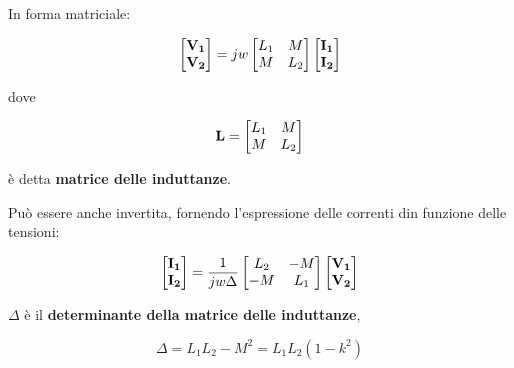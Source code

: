 In forma matriciale:

\begin{equation}
  \begin{bmatrix}
    \mathbf{V_1} \\
    \mathbf{V_2}
  \end{bmatrix}
  = jw
  \begin{bmatrix}
    L_1 & M   \\
    M   & L_2
  \end{bmatrix}
  \begin{bmatrix}
    \mathbf{I_1} \\
    \mathbf{I_2}
  \end{bmatrix}
\end{equation}

dove

\begin{equation}
  \mathbf{L} =
  \begin{bmatrix}
    L_1 & M   \\
    M   & L_2
  \end{bmatrix}
\end{equation}

è detta \textbf{matrice delle induttanze}.

Può essere anche invertita, fornendo l'espressione delle correnti din funzione delle tensioni:

\begin{equation}
  \begin{bmatrix}
    \mathbf{I_1} \\
    \mathbf{I_2}
  \end{bmatrix}
  = \frac{1}{jw \Delta}
  \begin{bmatrix}
    L_2 & -M  \\
    -M  & L_1
  \end{bmatrix}
  \begin{bmatrix}
    \mathbf{V_1} \\
    \mathbf{V_2}
  \end{bmatrix}
\end{equation}

$\Delta$ è il \textbf{determinante della matrice delle induttanze},

\begin{equation}
  \Delta = L_1 L_2 - M^2 = L_1 L_2 \left(1 - k^2\right)
\end{equation}


